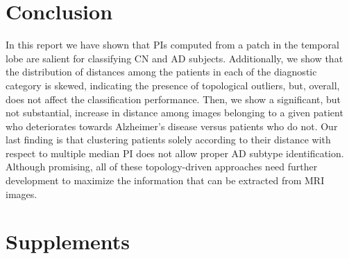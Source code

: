 \documentclass{article}
\begin{document}
\section{Conclusion}

In this report we have shown that PIs computed from a patch in the temporal lobe are salient for
classifying CN and AD subjects. Additionally, we show that the distribution of distances among the
patients in each of the diagnostic category is skewed, indicating the presence of topological
outliers, but, overall, does not affect the classification performance. Then, we show a significant,
but not substantial, increase in distance among images belonging to a given patient who deteriorates
towards Alzheimer's disease versus patients who do not. Our last finding is that clustering patients
solely according to their distance with respect to multiple median PI does not allow proper AD
subtype identification. Although promising, all of these topology-driven approaches need further
development to maximize the information that can be extracted from MRI images.

\clearpage
 

\clearpage
\appendix

\section{Supplements}
\end{document}
